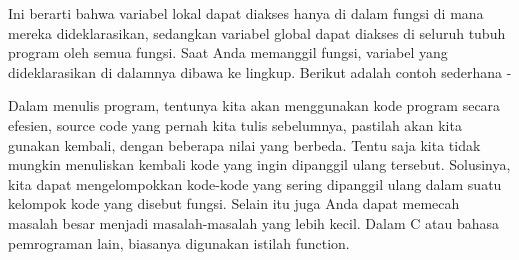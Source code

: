 Ini berarti bahwa variabel lokal dapat diakses hanya di dalam fungsi di mana mereka dideklarasikan, sedangkan variabel global dapat diakses di seluruh tubuh program oleh semua fungsi. Saat Anda memanggil fungsi, variabel yang dideklarasikan di dalamnya dibawa ke lingkup. Berikut adalah contoh sederhana - \par

Dalam   menulis   program, tentunya   kita   akan menggunakan kode program secara efesien, source code yang pernah kita tulis sebelumnya, pastilah akan kita  
gunakan  kembali,  dengan  beberapa  nilai  yang  berbeda. 
Tentu saja kita tidak mungkin menuliskan kembali  kode  yang  ingin  dipanggil  ulang  tersebut.  
Solusinya,  kita  dapat  mengelompokkan  kode-kode  yang sering dipanggil ulang dalam suatu kelompok kode yang disebut fungsi. 
Selain  itu  juga  Anda  dapat  memecah  masalah  besar  menjadi  masalah-masalah  yang  lebih  kecil.  Dalam  C  atau  bahasa  pemrograman  lain,  biasanya  digunakan istilah function. 
